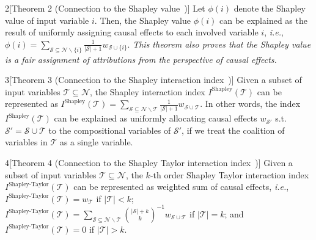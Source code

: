 \begin{manualtheorem}{2}[Theorem 2 {\normalfont (Connection to the Shapley value~\cite{shapley1953value})}]\label{th:app-harsanyi-shapley-value}
Let {\small $\phi(i)$} denote the Shapley value of input variable $i$.
Then, the Shapley value {\small$\phi(i)$} can be explained as the result of uniformly assigning causal effects to each involved variable {\small$i$}, \emph{i.e.}, {\small $\phi(i)=\sum_{\mathcal{S}\subseteq \mathcal{N}\backslash\{i\}}\frac{1}{|\mathcal{S}|+1} w_{\mathcal{S}\cup\{i\}}$}.
\emph{This theorem also proves that the Shapley value is a fair assignment of attributions from the perspective of causal effects.
}
\end{manualtheorem}

\begin{manualtheorem}{3}[Theorem 3 {\normalfont (Connection to the Shapley interaction index~\cite{grabisch1999axiomatic})}]\label{th:harsanyi-shapley-interaction}
Given a subset of input variables {\small $\mathcal{T} \subseteq \mathcal{N}$}, the Shapley interaction index {\small$I^{\textrm{Shapley}}(\mathcal{T})$} can be represented as {\small $I^{\textrm{Shapley}}(\mathcal{T})=\sum_{\mathcal{S}\subseteq \mathcal{N} \backslash\mathcal{T}}\frac{1}{|\mathcal{S}|+1}w_{\mathcal{S}\cup \mathcal{T}}$}.
In other words, the index {\small$I^{\textrm{Shapley}}(\mathcal{T})$} can be explained as uniformly allocating causal effects {\small$w_{\mathcal{S}'}$} s.t. {\small$\mathcal{S}'=\mathcal{S}\cup \mathcal{T}$} to the compositional variables of {\small$\mathcal{S}'$}, if we treat the coalition of variables in {\small $\mathcal{T}$} as a single variable.
\end{manualtheorem}

\begin{manualtheorem}{4}[Theorem 4 {\normalfont (Connection to the Shapley Taylor interaction index~\cite{sundararajan2020shapley})}]\label{th:harsanyi-shapley-taylor}
Given a subset of input variables {\small $\mathcal{T}\subseteq \mathcal{N}$}, the {\small$k$}-th order Shapley Taylor interaction index {\small $I^{\textrm{Shapley-Taylor}}(\mathcal{T})$} can be represented as weighted sum of causal effects, \emph{i.e.}, {\small $I^{\textrm{Shapley-Taylor}}(\mathcal{T})=w_{\mathcal{T}}$} if {\small $|\mathcal{T}|<k$}; {\small $I^{\textrm{Shapley-Taylor}}(\mathcal{T})=\sum_{\mathcal{S}\subseteq \mathcal{N}\backslash \mathcal{T}}\binom{|\mathcal{S}|+k}{k}^{-1}w_{\mathcal{S}\cup \mathcal{T}}$} if {\small $|\mathcal{T}|=k$}; and {\small $I^{\textrm{Shapley-Taylor}}(\mathcal{T})=0$ if $|\mathcal{T}|>k$}.
\end{manualtheorem}





